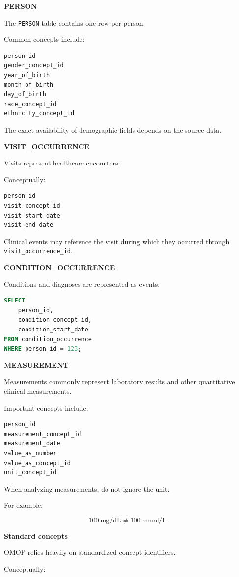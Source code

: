 \documentclass[11pt,letterpaper]{article}
\begin{document}
\textbf{PERSON}

The \texttt{PERSON} table contains one row per person.

Common concepts include:

\begin{lstlisting}
person_id
gender_concept_id
year_of_birth
month_of_birth
day_of_birth
race_concept_id
ethnicity_concept_id
\end{lstlisting}

The exact availability of demographic fields depends on the source data.

\textbf{VISIT\_OCCURRENCE}

Visits represent healthcare encounters.

Conceptually:

\begin{lstlisting}
person_id
visit_concept_id
visit_start_date
visit_end_date
\end{lstlisting}

Clinical events may reference the visit during which they occurred through
\texttt{visit\_occurrence\_id}.

\textbf{CONDITION\_OCCURRENCE}

Conditions and diagnoses are represented as events:

\begin{lstlisting}[language=SQL]
SELECT
    person_id,
    condition_concept_id,
    condition_start_date
FROM condition_occurrence
WHERE person_id = 123;
\end{lstlisting}

\textbf{MEASUREMENT}

Measurements commonly represent laboratory results and other quantitative
clinical measurements.

Important concepts include:

\begin{lstlisting}
person_id
measurement_concept_id
measurement_date
value_as_number
value_as_concept_id
unit_concept_id
\end{lstlisting}

When analyzing measurements, do not ignore the unit.

For example:

\[
100\ \text{mg/dL}
\neq
100\ \text{mmol/L}
\]

\textbf{Standard concepts}

OMOP relies heavily on standardized concept identifiers.

Conceptually:
\end{document}
